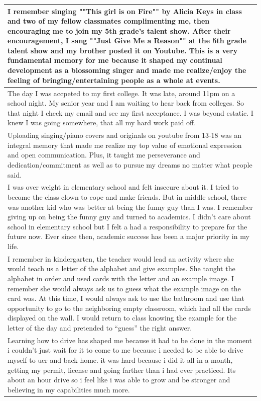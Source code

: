 \documentclass[
  .7em,
  letterpaper,
  DIV=11,
  numbers=noendperiod]{scrartcl}
\begin{document}
\begin{table}
\begin{tabular}{l}
\hline
I remember singing ""This girl is on Fire"" by Alicia Keys in class and two of my fellow classmates complimenting me, then encouraging me to join my 5th grade's talent show. After their encouragement, I sang ""Just Give Me a Reason"" at the 5th grade talent show and my brother posted it on Youtube. This is a very fundamental memory for me because it shaped my continual development as a blossoming singer and made me realize/enjoy the feeling of bringing/entertaining people as a whole at events.\\
\hline
The day I was accpeted to my first college. It was late, around 11pm on a school night. My senior year and I am waiting to hear back from colleges. So that night I check my email and see my first acceptance. I was beyond estatic. I knew I was going somewhere, that all my hard work paid off.\\
\hline
Uploading singing/piano covers and originals on youtube from 13-18 was an integral memory that made me realize my top value of emotional expression and open communication. Plus, it taught me perseverance and dedication/commitment as well as to pursue my dreams no matter what people said.\\
\hline
I was over weight in elementary school and felt insecure about it. I tried to become the class clown to cope and make friends. But in middle school, there was another kid who was better at being the funny guy than I was. I remember giving up on being the funny guy and turned to academics. I didn’t care about school in elementary school but I felt a had a responsibility to prepare for the future now. Ever since then, academic success has been a major priority in my life.\\
\hline
I remember in kindergarten, the teacher would lead an activity where she would teach us a letter of the alphabet and give examples. She taught the alphabet in order and used cards with the letter and an example image. I remember she would always ask us to guess what the example image on the card was. At this time, I would always ask to use the bathroom and use that opportunity to go to the neighboring empty classroom, which had all the cards displayed on the wall. I would return to class knowing the example for the letter of the day and pretended to “guess” the right answer.\\
\hline
Learning how to drive has shaped me because it had to be done in the moment i couldn't just wait for it to come to me because i needed to be able to drive myself to ucr and back home. it was hard because i did it all in a month, getting my permit, license and going farther than i had ever practiced. Its about an hour drive so i feel like i was able to grow and be stronger and believing in my capabilities much more.\\

\end{tabular}
\end{table}
\end{document}
